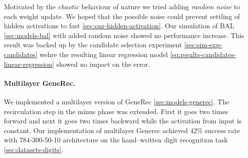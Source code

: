 Motivated by the \emph{chaotic} behaviour of nature we tried adding \emph{random noise} to each weight update. We hoped that the possible noise could prevent settling of hidden activations to fast \ref{sec:our-hidden-activation}. Our simulation of BAL \ref{sec:models-bal} with added random noise showed no performance increase. This result was backed up by the candidate selection experiment \ref{sec:sim-exp-candidates} wehre the resulting linear regression model \ref{eq:results-candidates-linear-regression} showed no impact on the error. 

\paragraph{Multilayer GeneRec.}

We implemented a multilayer version of GeneRec \ref{sec:models-generec}. The recirculation step in the minus phase was extended. First it goes two times forward and next it goes two times backward while the activation from input is constant. Our implementation of multilayer Generec achieved 42\% success rate with 784-300-50-10 architecture on the hand--written digit recognition task \ref{sec:datasets-digits}. 
